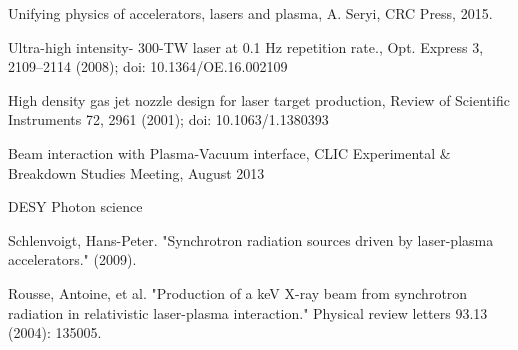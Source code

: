 \documentclass[a4paper,
              ]{jacow}
\begin{document}
\begin{thebibliography}{99}
 Unifying physics of accelerators, lasers and plasma, A. Seryi, CRC Press, 2015.

 Ultra-high intensity- 300-TW laser at 0.1 Hz repetition rate., Opt. Express 3, 2109--2114 (2008); doi: 10.1364/OE.16.002109

 High density gas jet nozzle design for laser target production, Review of Scientific Instruments 72, 2961 (2001); doi: 10.1063/1.1380393

Beam interaction with Plasma-Vacuum interface, CLIC Experimental \& Breakdown Studies Meeting, August 2013 

 DESY Photon science


 Schlenvoigt, Hans-Peter. "Synchrotron radiation sources driven by laser-plasma accelerators." (2009). 

 Rousse, Antoine, et al. "Production of a keV X-ray beam from synchrotron radiation in relativistic laser-plasma interaction." Physical review letters 93.13 (2004): 135005.



\end{thebibliography}
\end{document}
